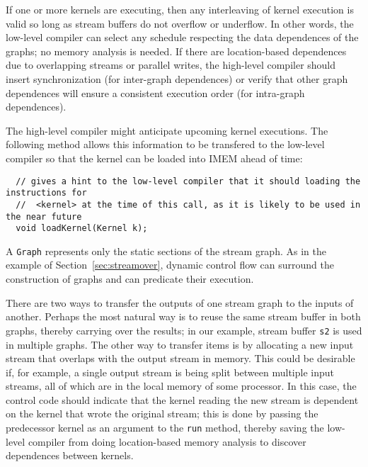 If one or more kernels are executing, then any interleaving of kernel
execution is valid so long as stream buffers do not overflow or
underflow.  In other words, the low-level compiler can select any
schedule respecting the data dependences of the graphs; no memory
analysis is needed.  If there are location-based dependences due to
overlapping streams or parallel writes, the high-level compiler should
insert synchronization (for inter-graph dependences) or verify that
other graph dependences will ensure a consistent execution order (for
intra-graph dependences).

The high-level compiler might anticipate upcoming kernel executions.
The following method allows this information to be transfered to the
low-level compiler so that the kernel can be loaded into IMEM ahead of
time:
\begin{verbatim}
  // gives a hint to the low-level compiler that it should loading the instructions for
  //  <kernel> at the time of this call, as it is likely to be used in the near future
  void loadKernel(Kernel k);
\end{verbatim}


A {\tt Graph} represents only the static sections of the stream graph.
As in the example of Section~\ref{sec:streamover}, dynamic control
flow can surround the construction of graphs and can predicate their
execution.

There are two ways to transfer the outputs of one stream graph to the
inputs of another.  Perhaps the most natural way is to reuse the same
stream buffer in both graphs, thereby carrying over the results; in
our example, stream buffer {\tt s2} is used in multiple graphs.  The
other way to transfer items is by allocating a new input stream that
overlaps with the output stream in memory.  This could be desirable
if, for example, a single output stream is being split between
multiple input streams, all of which are in the local memory of some
processor.  In this case, the control code should indicate that the
kernel reading the new stream is dependent on the kernel that wrote
the original stream; this is done by passing the predecessor kernel as
an argument to the {\tt run} method, thereby saving the low-level
compiler from doing location-based memory analysis to discover
dependences between kernels.

